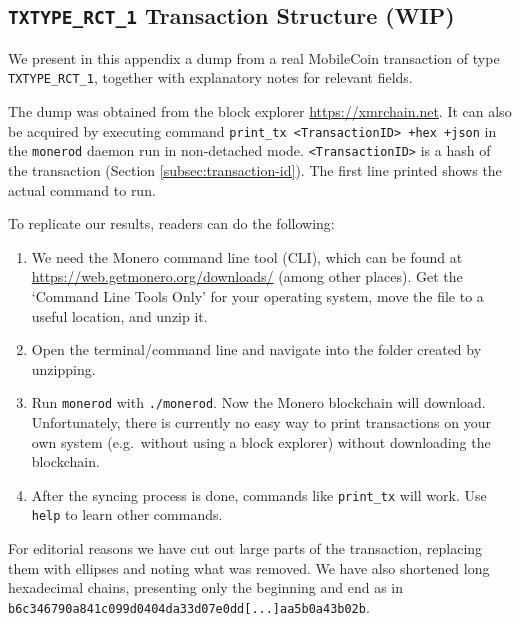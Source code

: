 \begin{appendices}

\renewcommand{\theFancyVerbLine}{%
	\textcolor{red}{\small
		\arabic{FancyVerbLine}}}

\chapter{{\tt TXTYPE\_RCT\_1} Transaction Structure (WIP)}
\label{appendix:TXTYPE_RCT_1}

We present in this appendix a dump from a real MobileCoin transaction of type {\tt TXTYPE\_RCT\_1}, 
together with explanatory notes for relevant fields.

The dump was obtained from the block explorer \url{https://xmrchain.net}. It can also be acquired by executing command {\tt print\_tx <TransactionID> +hex +json} in the {\tt monerod} daemon run in non-detached mode. {\tt <TransactionID>} is a hash of the transaction (Section \ref{subsec:transaction-id}). The first line printed shows the actual command to run.%

To replicate our results, readers can do the following:%
\begin{enumerate}
    \item We need the Monero command line tool (CLI), which can be found at \url{https://web.getmonero.org/downloads/} (among other places). Get the `Command Line Tools Only' for your operating system, move the file to a useful location, and unzip it.
    \item Open the terminal/command line and navigate into the folder created by unzipping.
    \item Run {\tt monerod} with {\tt ./monerod}. Now the Monero blockchain will download. Unfortunately, there is currently no easy way to print transactions on your own system (e.g.\ without using a block explorer) without downloading the blockchain.
    \item After the syncing process is done, commands like {\tt print\_tx} will work. Use {\tt help} to learn other commands.
\end{enumerate}
\fi %

For editorial reasons we have cut out large parts of the transaction, replacing them with ellipses and noting what was removed. We have also shortened long hexadecimal chains, presenting only the beginning and end as in {\tt b6c346790a841c099d0404da33d07e0dd[...]aa5b0a43b02b}.


\end{appendices}
